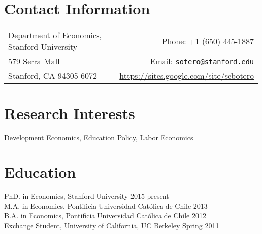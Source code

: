 \documentclass[margin,line]{res}
\begin{document}

\begin{resume}
\section{\sc Contact Information}
\vspace{.05in}
\hspace{-0.1in}
\begin{tabular}{lr}
Department of Economics, Stanford University      &  \hspace{1.35in} \hfill Phone:  +1 (650) 445-1887 \\            
579 Serra Mall  & \hfill   Email:  \href{mailto:sotero@stanford.edu}{\nolinkurl{sotero@stanford.edu}} \\      
Stanford, CA 94305-6072  & \hfill  \href{https://sites.google.com/site/sebotero}{https://sites.google.com/site/sebotero}  \\     
\end{tabular}


\section{\sc Research Interests}
Development Economics, Education Policy, Labor Economics

\section{\sc Education}
PhD. in Economics, Stanford University \hfill 2015-present \\
M.A. in Economics, Pontificia Universidad Cat\'olica de Chile \hfill 2013 \\
B.A. in Economics, Pontificia Universidad Cat\'olica de Chile \hfill 2012 \\
Exchange Student, University of California, UC Berkeley \hfill Spring 2011

%




\end{resume}
\end{document}
